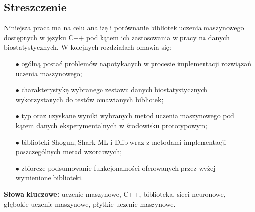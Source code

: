 
\subsection*{Streszczenie}

    Niniejsza praca ma na celu analizę i porównanie bibliotek uczenia maszynowego dostępnych w języku C++ pod kątem ich zastosowania w pracy na danych biostatystycznych. W kolejnych rozdziałach omawia się:
    
    \begin{itemize}
    	\item [$\bullet$] ogólną postać problemów napotykanych w procesie implementacji rozwiązań uczenia maszynowego;
    	\item [$\bullet$] charakterystykę wybranego zestawu danych biostatystycznych wykorzystanych do testów omawianych bibliotek;
    	\item [$\bullet$] typ oraz uzyskane wyniki wybranych metod uczenia maszynowego pod kątem danych eksperymentalnych w środowisku prototypowym;
    	\item [$\bullet$] biblioteki Shogun, Shark-ML i Dlib wraz z metodami implementacji poszczególnych metod wzorcowych;
    	\item [$\bullet$] zbiorcze podsumowanie funkcjonalności oferowanych przez wyżej wymienione biblioteki.
    \end{itemize}

	

\vspace{1cm}
\noindent\textbf{Słowa kluczowe:} uczenie maszynowe, C++, biblioteka, sieci neuronowe, głębokie uczenie maszynowe, płytkie uczenie maszynowe.
